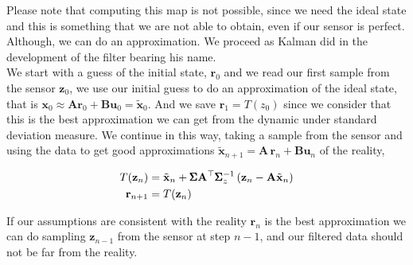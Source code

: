 Please note that computing this map is not possible, since we need the ideal state and this is something that we are not able to obtain, even if our sensor is perfect. Although, we can do an approximation. We proceed as Kalman did in the development of the filter bearing his name.\\

We start with a guess of the initial state, $\mathbf{r}_0$ and we read our first sample from the sensor $\mathbf{z}_0$, we use our initial guess to do an approximation of the ideal state, that is $\mathbf{x}_{0}\approx \mathbf{A}\mathbf{r}_0+\mathbf{B}\mathbf{u}_0=\tilde{\mathbf{x}}_0$. And we save $\mathbf{r}_{1}=T(z_{0})$ since we consider that this is the best approximation we can get from the dynamic under standard deviation measure. We continue in this way, taking a sample from the sensor and using the data to get good approximations $\tilde{\mathbf{x}}_{n+1}=\mathbf{A}\,\mathbf{r}_n+
\mathbf{B}\mathbf{u}_n$ of the reality, 

\begin{align}
T(\mathbf{z}_{n})&=\tilde{\mathbf{x}}_{n}+\pmb{\Sigma}\mathbf{A}^{\top}\pmb{\Sigma}_z^{-1}\left( \mathbf{z}_n-\mathbf{A}\tilde{\mathbf{x}}_n \right)\\
\mathbf{r}_{n+1}&=T(\mathbf{z}_n)
\end{align}

If our assumptions are consistent with the reality $\mathbf{r}_n$ is the best approximation we can do sampling $\mathbf{z}_{n-1}$ from the sensor  at step $n-1$, and our filtered data should not be far from the reality.


